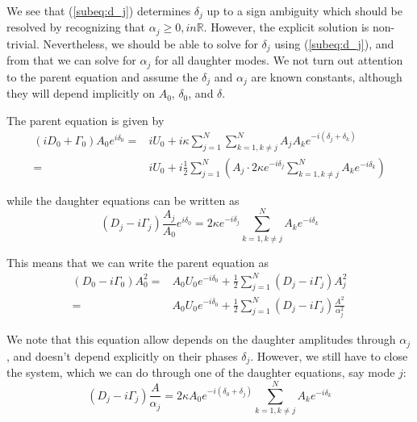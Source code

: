 We see that (\ref{subeq:d_j}) determines $\delta_j$ up to a sign ambiguity which should be resolved by recognizing that $\alpha_j \geq 0, in \mathbb{R}$. However, the explicit solution is non-trivial. Nevertheless, we should be able to solve for $\delta_j$ using (\ref{subeq:d_j}), and from that we can solve for $\alpha_j$ for all daughter modes. We not turn out attention to the parent equation and assume the $\delta_j$ and $\alpha_j$ are known constants, although they will depend implicitly on $A_0$, $\delta_0$, and $\delta$.

The parent equation is given by
\begin{subequations}
\begin{align}
(iD_0 + \Gamma_0) A_0 e^{i\delta_0} = & i U_0 + i \kappa \sum_{j=1}^N \sum_{k=1, k\neq j}^N A_j A_k e^{-i(\delta_j + \delta_k)} \\
                                     = & i U_0 + i \frac{1}{2} \sum_{j=1}^N \left( A_j \cdot 2\kappa e^{-i\delta_j} \sum_{k=1,k\neq j}^N A_k e^{-i\delta_k} \right) 
\end{align}
\end{subequations}

while the daughter equations can be written as
\begin{equation}
\left( D_j - i\Gamma_j\right)\frac{A_j}{A_0} e^{i\delta_0} = 2\kappa e^{-i\delta_j} \sum_{k=1,k\neq j}^N A_k e^{-i\delta_k}
\end{equation}

This means that we can write the parent equation as
\begin{subequations}
\begin{align}
(D_0 - i \Gamma_0) A_0^2 = & A_0 U_0 e^{-i\delta_0} + \frac{1}{2}\sum_{j=1}^N {\left(D_j -i\Gamma_j\right)A_j^2 } \\
                         = & A_0 U_0 e^{-i\delta_0} + \frac{1}{2}\sum_{j=1}^N \left(D_j - i \Gamma_j\right) \frac{A^2}{\alpha_j^2}
\end{align}
\end{subequations}

We note that this equation allow depends on the daughter amplitudes through $\alpha_j$, and doesn't depend explicitly on their phases $\delta_j$. However, we still have to close the system, which we can do through one of the daughter equations, say mode $j$:
\begin{equation}
\left( D_j - i\Gamma_j\right)\frac{A}{\alpha_j} = 2\kappa A_0 e^{-i(\delta_0 + \delta_j)} \sum_{k=1,k\neq j}^N A_k e^{-i\delta_k}
\end{equation}

